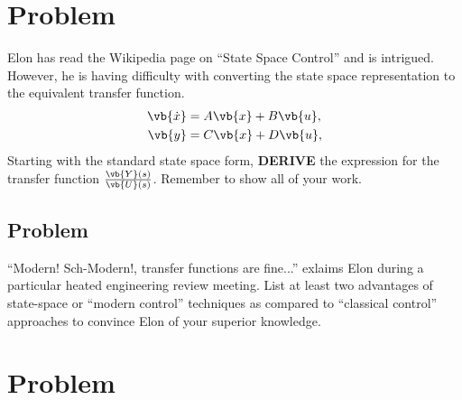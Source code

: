\documentclass[titlepage, 11pt, reqno]{article}    %
\begin{document}
\clearpage\newpage
\mbox{}
\clearpage\newpage

\section{Problem}
Elon has read the Wikipedia page on ``State Space Control'' and is intrigued.
However, he is having difficulty with converting the state space representation to the equivalent transfer function.
\begin{align*}
    \vb{\dot{x}} &= A \vb{x} + B \vb{u}, \\
    \vb{y} &= C \vb{x} + D\vb{u},
\end{align*}
Starting with the standard state space form, \textbf{DERIVE} the expression for the transfer function \(\frac{\vb{Y}(s)}{\vb{U}(s)}\).
Remember to show all of your work.
\vspace{13cm}
\subsection{Problem}
``Modern! Sch-Modern!, transfer functions are fine...'' exlaims Elon during a particular heated engineering review meeting.
List at least two advantages of state-space or ``modern control'' techniques as compared to ``classical control'' approaches to convince Elon of your superior knowledge.
\vspace{5cm}
\clearpage
\section{Problem}
\end{document}
